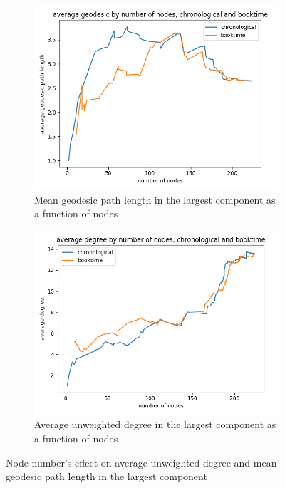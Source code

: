 \begin{figure}[ht]
    \centering
    \begin{subfigure}{0.4\textwidth}
        \includegraphics[width=1.\textwidth]{images/n_vs_geodesic-weighted_False.png}
        \caption{Mean geodesic path length in the largest component as a function of nodes}
    \end{subfigure}
    \begin{subfigure}{0.4\textwidth}
        \includegraphics[width=1.\textwidth]{images/n_vs_avg_degree-weighted_False.png}
        \caption{Average unweighted degree in the largest component as a function of nodes}
    \end{subfigure}
    \caption{Node number's effect on average unweighted degree and mean geodesic path length in the largest component}
    \label{sparsification-densification}
\end{figure}

